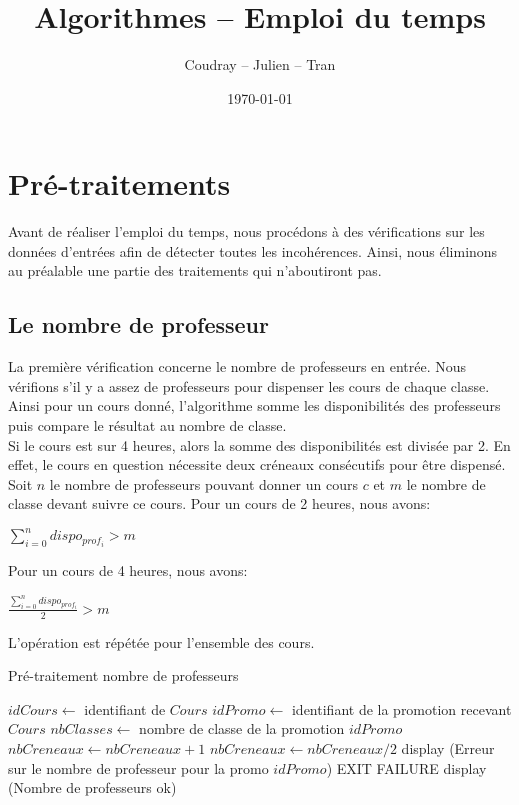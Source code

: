 \documentclass[12pt,a4paper,french]{article}
\begin{document}
\title{Algorithmes -- Emploi du temps}
\author{Coudray -- Julien -- Tran}
\date{\today}
\maketitle

\section{Pré-traitements}
Avant de réaliser l'emploi du temps, nous procédons à des vérifications sur les données d'entrées afin de détecter toutes les incohérences. Ainsi, nous éliminons au préalable une partie des traitements qui n'aboutiront pas.

\subsection{Le nombre de professeur}
La première vérification concerne le nombre de professeurs en entrée. Nous vérifions s'il y a assez de professeurs pour dispenser les cours de chaque classe.
Ainsi pour un cours donné, l'algorithme somme les disponibilités des professeurs puis compare le résultat au nombre de classe.\\
Si le cours est sur 4 heures, alors la somme des disponibilités est divisée par 2. En effet, le cours en question nécessite deux créneaux consécutifs pour être dispensé.\\

Soit $n$ le nombre de professeurs pouvant donner un cours $c$ et $m$ le nombre de classe devant suivre ce cours.
Pour un cours de 2 heures, nous avons:
\begin{center}
$\sum_{i=0}^n dispo_{prof_i} > m$
\end{center}

Pour un cours de 4 heures, nous avons: 
\begin{center}
$\frac{\sum_{i=0}^n dispo_{prof_i}}{2} > m$
\end{center}

L'opération est répétée pour l'ensemble des cours. 

\begin{algorithm}
\caption{Pré-traitement nombre de professeurs}
\begin{algorithmic}
\STATE $idCours \leftarrow$ identifiant de $Cours$
\STATE $idPromo \leftarrow$ identifiant de la promotion recevant $Cours$
\STATE $nbClasses \leftarrow$ nombre de classe de la promotion $idPromo$
\STATE $nbCreneaux \leftarrow nbCreneaux + 1$
\ENDIF
\ENDFOR
\ENDIF
\ENDFOR
{}
\STATE $nbCreneaux \leftarrow nbCreneaux / 2$
\ENDIF
{}
\STATE display (Erreur sur le nombre de professeur pour la promo $idPromo$)
\STATE EXIT FAILURE
\ENDIF
\ENDFOR
\STATE display (Nombre de professeurs ok)
\end{algorithmic}
\end{algorithm}
\end{document}
